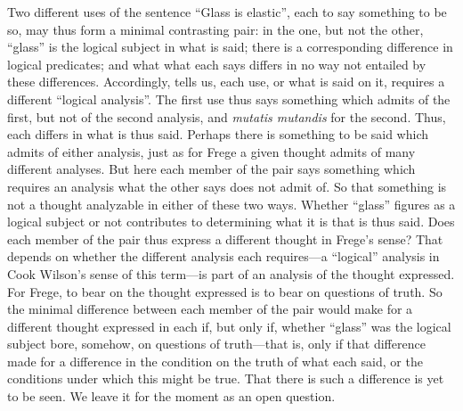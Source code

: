 Two different uses of the sentence ``Glass is elastic'', each to say something to be so, may thus form a minimal contrasting pair: in the one, but not the other, ``glass'' is the logical subject in what is said; there is a corresponding difference in logical predicates; and what what each says differs in no way not entailed by these differences. Accordingly, \citet[125]{Cook-Wilson:1926sf} tells us, each use, or what is said on it, requires a different ``logical analysis''. The first use thus says something which admits of the first, but not of the second analysis, and \emph{mutatis mutandis} for the second. Thus, each differs in what is thus said. Perhaps there is something to be said which admits of either analysis, just as for Frege a given thought admits of many different analyses. But here each member of the pair says something which requires an analysis what the other says does not admit of. So that something is not a thought analyzable in either of these two ways. Whether ``glass'' figures as a logical subject or not contributes to determining what it is that is thus said. Does each member of the pair thus express a different thought in Frege’s sense? That depends on whether the different analysis each requires---a ``logical'' analysis in Cook Wilson's sense of this term---is part of an analysis of the thought expressed. For Frege, to bear on the thought expressed is to bear on questions of truth. So the minimal difference between each member of the pair would make for a different thought expressed in each if, but only if, whether ``glass'' was the logical subject bore, somehow, on questions of truth---that is, only if that difference made for a difference in the condition on the truth of what each said, or the conditions under which this might be true. That there is such a difference is yet to be seen. We leave it for the moment as an open question.

